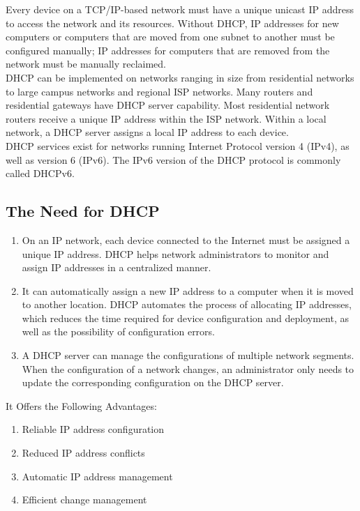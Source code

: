 \documentclass[11pt]{article}
\begin{document}
Every device on a TCP/IP-based network must have a unique unicast IP address to access the network and its resources. Without DHCP, IP addresses for new computers or computers that are moved from one subnet to another must be configured manually; IP addresses for computers that are removed from the network must be manually reclaimed.\\


DHCP can be implemented on networks ranging in size from residential networks to large campus networks and regional ISP networks. Many routers and residential gateways have DHCP server capability. Most residential network routers receive a unique IP address within the ISP network. Within a local network, a DHCP server assigns a local IP address to each device.\\

DHCP services exist for networks running Internet Protocol version 4 (IPv4), as well as version 6 (IPv6). The IPv6 version of the DHCP protocol is commonly called DHCPv6.
\subsection{The Need for DHCP}
\begin{enumerate}
	\item On an IP network, each device connected to the Internet must be assigned a unique IP address. DHCP helps network administrators to monitor and assign IP addresses in a centralized manner.
	\item It can automatically assign a new IP address to a computer when it is moved to another location. DHCP automates the process of allocating IP addresses, which reduces the time required for device configuration and deployment, as well as the possibility of configuration errors. 
	\item A DHCP server can manage the configurations of multiple network segments. When the configuration of a network changes, an administrator only needs to update the corresponding configuration on the DHCP server.
\end{enumerate}
It Offers the Following Advantages:
\begin{enumerate}
	\item Reliable IP address configuration
	\item Reduced IP address conflicts
	\item Automatic IP address management
	\item Efficient change management
\end{enumerate}
\end{document}
